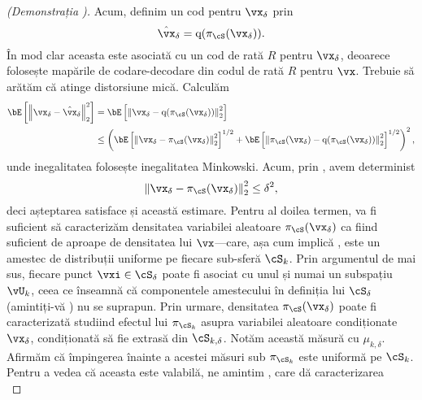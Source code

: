 \documentclass[../../book-main_ro.tex]{subfiles}
\begin{document}
\begin{proof}[(Demonstrația )]
    Acum, definim un cod pentru $\vx_{\delta}$ prin
    \begin{equation}
        \hat{\vx}_{\delta} = \mathrm{q}( \pi_{\cS}(\vx_{\delta}) ).
    \end{equation}
    În mod clar aceasta este asociată cu un cod de rată $R$ pentru $\vx_{\delta}$, deoarece
    folosește mapările de codare-decodare din codul de rată $R$ pentru $\vx$. Trebuie
    să arătăm că atinge distorsiune mică.
    Calculăm
    \begin{align}
        \bE\left[ \norm*{ \vx_{\delta} - \hat{\vx}_{\delta} }_2^2 \right]
        &=
        \bE\left[ \norm*{ \vx_{\delta} - \mathrm{q}(\pi_{\cS}(\vx_{\delta})) }_2^2 \right]
        \\
        &\leq
        \left(
        \bE\left[ \norm*{ \vx_{\delta} - \pi_{\cS}(\vx_{\delta}) }_2^2
        \right]^{1/2}
        + \bE\left[ \norm*{ \pi_{\cS}(\vx_{\delta})
        - \mathrm{q}(\pi_{\cS}(\vx_{\delta})) }_2^2 \right]^{1/2}
        \right)^2,\label{eq:distortion-decomposition}
    \end{align}
    unde inegalitatea folosește inegalitatea Minkowski.
    Acum, prin , avem
    determinist
    \begin{equation}
        \norm*{ \vx_{\delta} - \pi_{\cS}(\vx_{\delta}) }_2^2
        \leq \delta^2,
    \end{equation}
    deci așteptarea satisface și această estimare.
    Pentru al doilea termen, va fi suficient să caracterizăm densitatea
    variabilei aleatoare $\pi_{\cS}(\vx_{\delta})$ ca fiind suficient de aproape de
    densitatea lui $\vx$---care, așa cum implică , este
    un amestec de distribuții uniforme pe fiecare sub-sferă $\cS_k$.
    Prin argumentul de mai sus, fiecare punct $\vxi \in \cS_{\delta}$ poate fi asociat
    cu unul și numai un subspațiu $\vU_k$, ceea ce înseamnă că componentele
    amestecului în definiția lui $\cS_{\delta}$ (amintiți-vă
    ) nu se suprapun. Prin urmare, densitatea
    $\pi_{\cS}(\vx_{\delta})$ poate fi caracterizată studiind efectul lui
    $\pi_{\cS_k}$ asupra variabilei aleatoare condiționate $\vx_{\delta}$, condiționată
    să fie extrasă din $\cS_{k, \delta}$. Notăm această măsură cu $\mu_{k,
    \delta}$.
    Afirmăm că împingerea înainte a acestei măsuri sub $\pi_{\cS_k}$ este uniformă pe $\cS_k$.
    Pentru a vedea că aceasta este valabilă, ne amintim
    ,
    care dă caracterizarea
    \begin{equation}

\end{equation}
\end{proof}
\end{document}
